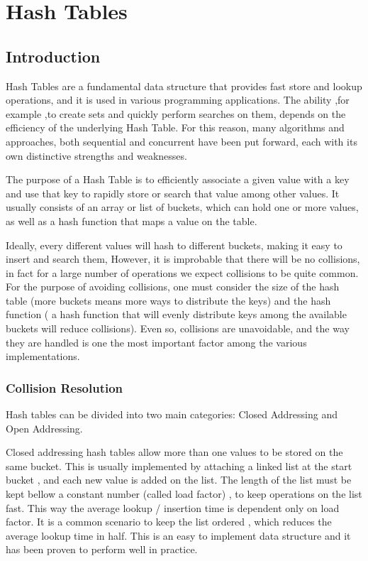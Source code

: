 
\def\<#1>{\textit{#1}}

\chapter{Hash Tables}
\section{Introduction}

Hash Tables are a fundamental data structure that provides fast store and lookup operations, and it is used in various programming applications. The ability ,for example ,to create sets and quickly perform searches on them, depends on the efficiency of the underlying Hash Table. For this reason, many algorithms and approaches, both sequential and concurrent have been put forward, each with its own distinctive strengths and weaknesses. 

The purpose of a Hash Table is to efficiently associate a given value with a key and use that key to rapidly store or search that value among other values. It usually consists of an array or list of buckets, which can hold one or more values, as well as a hash function that maps a value on the table.

Ideally,  every different values will hash to different buckets, making it easy to insert and search them, However, it is improbable that there will be no collisions, in fact for a large number of operations we expect collisions to be quite common. For the purpose of avoiding collisions, one must consider the size of the hash table (more buckets  means more ways to distribute the keys) and the hash function ( a hash function that will evenly distribute keys among the available buckets will reduce collisions). Even so, collisions are unavoidable, and the way they are handled is one the most important factor among the various implementations.

\subsection{Collision Resolution}

Hash tables can be divided into two main categories: Closed Addressing and Open Addressing.


Closed addressing hash tables allow more than one values to be stored on the same bucket. This is usually implemented by attaching a linked list at the start bucket , and each new value is added on the list. The length of the list  must be kept bellow a constant number (called load factor) , to keep operations on the list fast. This way the average lookup / insertion time is dependent only on load factor. It is a common scenario to keep the list ordered , which reduces the average lookup time in half. This is an easy to implement data structure and it has been proven to perform well in practice.

